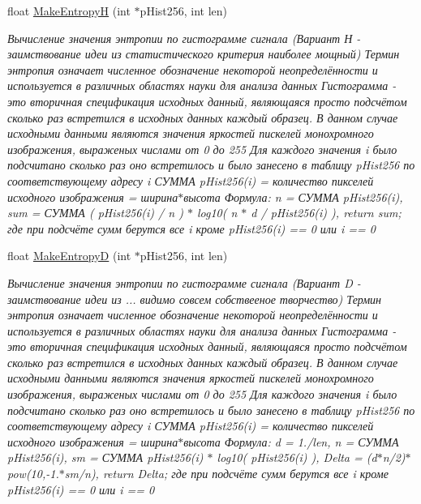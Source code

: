\begin{DoxyCompactItemize}
float \hyperlink{class_c_v_i_engine_base_a4893abd93ae9de7f3913f24c872b23f8}{Make\+Entropy\+H} (int $\ast$p\+Hist256, int len)
\begin{DoxyCompactList}\small\item\em Вычисление значения энтропии по гистограмме сигнала (Вариант Н -\/ заимствование идеи из статистического критерия наиболее мощный) Термин энтропия означает численное обозначение некоторой неопределённости и используется в различных областях науки для анализа данных Гистограмма -\/ это вторичная спецификация исходных данный, являющаяся просто подсчётом сколько раз встретился в исходных данных каждый образец. В данном случае исходными данными являются значения яркостей пискелей монохромного изображения, выраженых числами от 0 до 255 Для каждого значения i было подсчитано сколько раз оно встретилось и было занесено в таблицу p\+Hist256 по соответствующему адресу i СУММА p\+Hist256(i) = количество пикселей исходного изображения = ширина$\ast$высота Формула\+: n = СУММА p\+Hist256(i), sum = СУММА ( p\+Hist256(i) / n ) $\ast$ log10( n $\ast$ d / p\+Hist256(i) ), return sum; где при подсчёте сумм берутся все i кроме p\+Hist256(i) == 0 или i == 0 \end{DoxyCompactList}\item 
float \hyperlink{class_c_v_i_engine_base_a4a6d774f1ebf9e8bf595c3e3e60f06a7}{Make\+Entropy\+D} (int $\ast$p\+Hist256, int len)
\begin{DoxyCompactList}\small\item\em Вычисление значения энтропии по гистограмме сигнала (Вариант D -\/ заимствование идеи из ... видимо совсем собствееное творчество) Термин энтропия означает численное обозначение некоторой неопределённости и используется в различных областях науки для анализа данных Гистограмма -\/ это вторичная спецификация исходных данный, являющаяся просто подсчётом сколько раз встретился в исходных данных каждый образец. В данном случае исходными данными являются значения яркостей пискелей монохромного изображения, выраженых числами от 0 до 255 Для каждого значения i было подсчитано сколько раз оно встретилось и было занесено в таблицу p\+Hist256 по соответствующему адресу i СУММА p\+Hist256(i) = количество пикселей исходного изображения = ширина$\ast$высота Формула\+: d = 1./len, n = СУММА p\+Hist256(i), sm = СУММА p\+Hist256(i) $\ast$ log10( p\+Hist256(i) ), Delta = (d$\ast$n/2)$\ast$pow(10,-\/1.$\ast$sm/n), return Delta; где при подсчёте сумм берутся все i кроме p\+Hist256(i) == 0 или i == 0 \end{DoxyCompactList}\item 

\end{DoxyCompactItemize}
